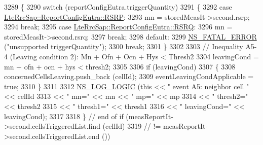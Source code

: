 \begin{DoxyCode}
3289                       \{
3290                         \textcolor{keywordflow}{switch} (reportConfigEutra.triggerQuantity)
3291                           \{
3292                           \textcolor{keywordflow}{case} \hyperlink{structns3_1_1LteRrcSap_1_1ReportConfigEutra_a82343ddf526faba0483431ea5882a3efa5b7591e86ab7bcefc7fe1528762114d7}{LteRrcSap::ReportConfigEutra::RSRP}:
3293                             mn = storedMeasIt->second.rsrp;
3294                             \textcolor{keywordflow}{break};
3295                           \textcolor{keywordflow}{case} \hyperlink{structns3_1_1LteRrcSap_1_1ReportConfigEutra_a82343ddf526faba0483431ea5882a3efaa4e09cb3c7154d7ab732115a2647325f}{LteRrcSap::ReportConfigEutra::RSRQ}:
3296                             mn = storedMeasIt->second.rsrq;
3297                             \textcolor{keywordflow}{break};
3298                           \textcolor{keywordflow}{default}:
3299                             \hyperlink{group__fatal_ga5131d5e3f75d7d4cbfd706ac456fdc85}{NS\_FATAL\_ERROR} (\textcolor{stringliteral}{"unsupported triggerQuantity"});
3300                             \textcolor{keywordflow}{break};
3301                           \}
3302 
3303                         \textcolor{comment}{// Inequality A5-4 (Leaving condition 2): Mn + Ofn + Ocn + Hys < Thresh2}
3304                         leavingCond = mn + ofn + ocn + hys < thresh2;
3305 
3306                         \textcolor{keywordflow}{if} (leavingCond)
3307                           \{
3308                             concernedCellsLeaving.push\_back (cellId);
3309                             eventLeavingCondApplicable = \textcolor{keyword}{true};
3310                           \}
3311 
3312                         \hyperlink{group__logging_ga88acd260151caf2db9c0fc84997f45ce}{NS\_LOG\_LOGIC} (\textcolor{keyword}{this} << \textcolor{stringliteral}{" event A5: neighbor cell "} << cellId
3313                                            << \textcolor{stringliteral}{" mn="} << mn << \textcolor{stringliteral}{" mp="} << mp
3314                                            << \textcolor{stringliteral}{" thresh2="} << thresh2
3315                                            << \textcolor{stringliteral}{" thresh1="} << thresh1
3316                                            << \textcolor{stringliteral}{" leavingCond="} << leavingCond);
3317 
3318                       \} \textcolor{comment}{// end of if (measReportIt->second.cellsTriggeredList.find (cellId)}
3319                         \textcolor{comment}{//            != measReportIt->second.cellsTriggeredList.end ())}

\end{DoxyCode}
